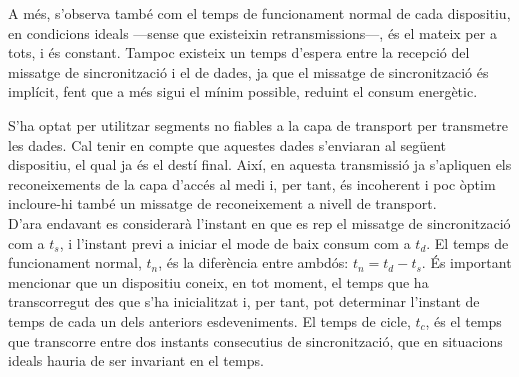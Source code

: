 \documentclass{tfgitic}[2024/07/01]
\begin{document}
{A més, s'observa també com el temps de funcionament normal de cada dispositiu, en condicions ideals ---sense que existeixin retransmissions---, és el mateix per a tots, i és constant. Tampoc existeix un temps d'espera entre la recepció del missatge de sincronització i el de dades, ja que el missatge de sincronització és implícit, fent que a més sigui el mínim possible, reduint el consum energètic.

S'ha optat per utilitzar segments no fiables a la capa de transport per transmetre les dades. Cal tenir en compte que aquestes dades s'enviaran al següent dispositiu, el qual ja és el destí final. Així, en aquesta transmissió ja s'apliquen els reconeixements de la capa d'accés al medi i, per tant, és incoherent i poc òptim incloure-hi també un missatge de reconeixement a nivell de transport.
\\
D'ara endavant es considerarà l'instant en que es rep el missatge de sincronització com a $t_s$, i l'instant previ a iniciar el mode de baix consum com a $t_d$. El temps de funcionament normal, $t_n$, és la diferència entre ambdós: $t_n = t_d - t_s$. És important mencionar que un dispositiu coneix, en tot moment, el temps que ha transcorregut des que s'ha inicialitzat i, per tant, pot determinar l'instant de temps de cada un dels anteriors esdeveniments.
El temps de cicle, $t_c$, és el temps que transcorre entre dos instants consecutius de sincronització, que en situacions ideals hauria de ser invariant en el temps.




}
\end{document}
